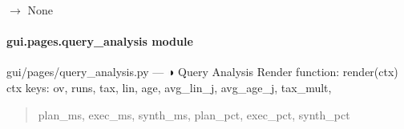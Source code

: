 \documentclass[letterpaper,10pt,english]{sphinxmanual}
\begin{document}
\begin{fulllineitems}
\label{\detokenize{gui.pages.phase_drilldown:gui.pages.phase_drilldown.render}}
\pysigstartsignatures
\pysiglinewithargsret
{}
{}
{{ $\rightarrow$ None}}
\pysigstopsignatures
\end{fulllineitems}


\sphinxstepscope


\paragraph{gui.pages.query\_analysis module}
\label{\detokenize{gui.pages.query_analysis:module-gui.pages.query_analysis}}\label{\detokenize{gui.pages.query_analysis:gui-pages-query-analysis-module}}\label{\detokenize{gui.pages.query_analysis::doc}}
\sphinxAtStartPar
gui/pages/query\_analysis.py  —  ◑  Query Analysis
Render function: render(ctx)
ctx keys: ov, runs, tax, lin, age, avg\_lin\_j, avg\_age\_j, tax\_mult,
\begin{quote}

\sphinxAtStartPar
plan\_ms, exec\_ms, synth\_ms, plan\_pct, exec\_pct, synth\_pct
\end{quote}

\begin{fulllineitems}
\label{\detokenize{gui.pages.query_analysis:gui.pages.query_analysis.render}}
\pysigstartsignatures
\pysiglinewithargsret
{}
{}
{}
\pysigstopsignatures
\end{fulllineitems}


\sphinxstepscope
\end{document}
